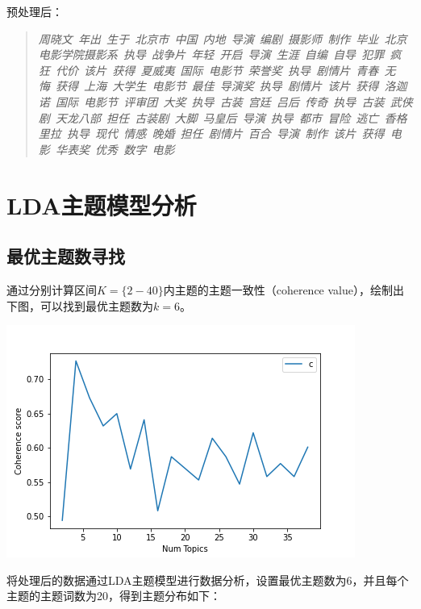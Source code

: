 \documentclass{article} [NO-DEFAULT-PACKAGES] \usepackage{wx672hyperref}
\begin{document}
预处理后：

\begin{quotation}
\textit{周晓文\ 年出\ 生于\ 北京市\ 中国\ 内地\ 导演\ 编剧\ 摄影师\ 制作\ 毕业\ 北京电影学院摄影系\ 执导\ 战争片\ 年轻\ 开启\ 导演\ 生涯\ 自编\ 自导\ 犯罪\ 疯狂\ 代价\ 该片\ 获得\ 夏威夷\ 国际\ 电影节\ 荣誉奖\ 执导\ 剧情片\ 青春\ 无悔\ 获得\ 上海\ 大学生\ 电影节\ 最佳\ 导演奖\ 执导\ 剧情片\ 该片\ 获得\ 洛迦诺\ 国际\ 电影节\ 评审团\ 大奖\ 执导\ 古装\ 宫廷\ 吕后\ 传奇\ 执导\ 古装\ 武侠剧\ 天龙八部\ 担任\ 古装剧\ 大脚\ 马皇后\ 导演\ 执导\ 都市\ 冒险\ 逃亡\ 香格里拉\ 执导\ 现代\ 情感\ 晚婚\ 担任\ 剧情片\ 百合\ 导演\ 制作\ 该片\ 获得\ 电影\ 华表奖\ 优秀\ 数字\ 电影}
\end{quotation}

\section{LDA主题模型分析}
\label{sec:org56904e1}

\subsection{最优主题数寻找}

通过分别计算区间$K=\{2-40\}$内主题的主题一致性（coherence value），绘制出下图，可以找到最优主题数为$k=6$。

\begin{center}
\includegraphics[width=1.0\linewidth]{./static/coherence.png}
\end{center}  

将处理后的数据通过LDA主题模型进行数据分析，设置最优主题数为6，并且每个主题的主题词数为20，得到主题分布如下：\\
\end{document}
